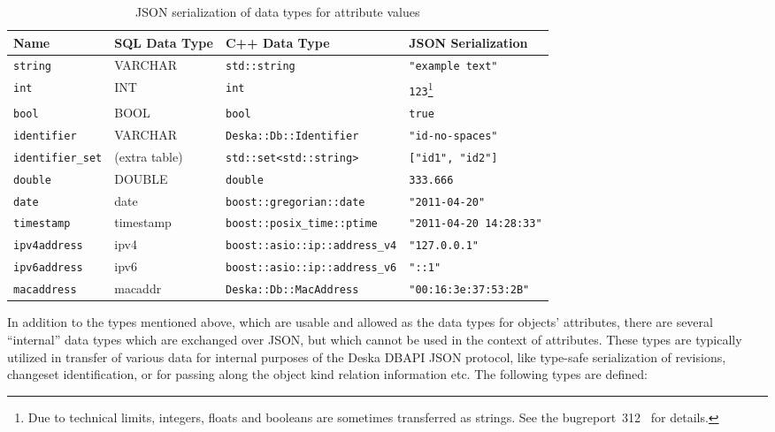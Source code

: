 \documentclass[deska]{subfiles}
\begin{document}
\begin{longtable}{ p{24mm} | p{25mm} p{47mm} p{30mm} }
    \caption{JSON serialization of data types for attribute values} \\
    Name & SQL Data Type & C++ Data Type & JSON Serialization \\
    \hline
    \endhead
    {\tt string} & VARCHAR & {\tt std::string} & {\tt "example text"} \\
    {\tt int} & INT & {\tt int} & {\tt 123}\footnote{Due to technical limits, integers, floats and booleans are
    sometimes transferred as strings.  See the bugreport~312~\cite{redmine-312} for details.}\\
    {\tt bool} & BOOL & {\tt bool} & {\tt true} \\
    {\tt identifier} & VARCHAR & {\tt Deska::Db::Identifier} & {\tt "id-no-spaces"} \\
    {\tt identifier\_set} & (extra table) & {\tt std::set<std::string>} & {\tt ["id1", "id2"]} \\
    {\tt double} & DOUBLE & {\tt double} & {\tt 333.666} \\
    {\tt date} & date & {\tt boost::gregorian::date} & {\tt "2011-04-20"} \\
    {\tt timestamp} & timestamp & {\tt boost::posix\_time::ptime} & {\tt "2011-04-20 14:28:33"} \\
    {\tt ipv4address} & ipv4 & {\tt boost::asio::ip::address\_v4} & {\tt "127.0.0.1"} \\
    {\tt ipv6address} & ipv6 & {\tt boost::asio::ip::address\_v6} & {\tt "::1"} \\
    {\tt macaddress} & macaddr & {\tt Deska::Db::MacAddress} & {\tt "00:16:3e:37:53:2B"} \\
\end{longtable}

In addition to the types mentioned above, which are usable and allowed as the data types for objects' attributes, there
are several ``internal'' data types which are exchanged over JSON, but which cannot be used in the context of
attributes.  These types are typically utilized in transfer of various data for internal purposes of the Deska
DBAPI JSON protocol, like type-safe serialization of revisions, changeset identification, or for passing along the object kind
relation information etc.  The following types are defined:
\end{document}
